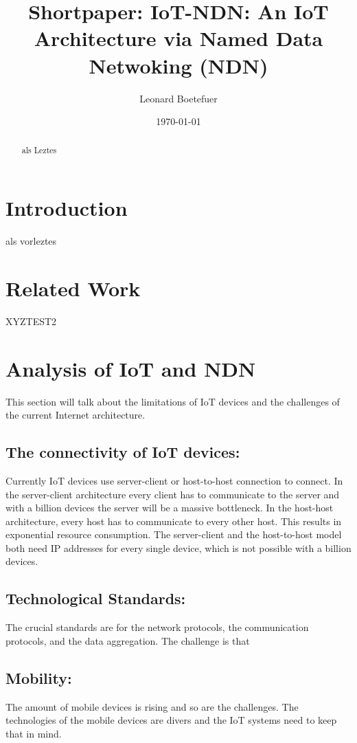 \documentclass[conference]{IEEEtran}
\title{\textbf{Shortpaper:} IoT-NDN: An IoT Architecture via Named Data
Netwoking (NDN)\\}
\author{Leonard Boetefuer}
\date{\today}
\begin{document}
\maketitle

\begin{abstract}
als Leztes
\end{abstract}

\section{Introduction}
als vorleztes
\section{Related Work}
XYZTEST2
\section{Analysis of IoT and NDN}
This section will talk about the limitations of IoT devices and the challenges of the current Internet architecture.
\subsection{The connectivity of IoT devices:}
Currently IoT devices use server-client or host-to-host connection to connect. 
In the server-client architecture every client has to communicate to the server and with a billion devices the server will be a massive bottleneck. In the host-host architecture, every host has to communicate to every other host. This results in exponential resource consumption.
The server-client and the host-to-host model both need IP addresses for every single device, which is not possible with a billion devices.

\subsection{Technological Standards:}
The crucial standards are for the network protocols, the communication protocols, and the data aggregation. 
The challenge is that 


\subsection{Mobility:}
The amount of mobile devices is rising and so are the challenges. The technologies of the mobile devices are divers and the IoT systems need to keep that in mind.
\end{document}
